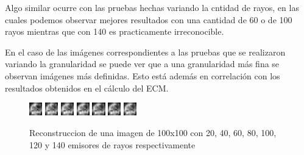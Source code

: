 Algo similar ocurre con las pruebas hechas variando la cntidad de rayos, en las cuales podemos observar mejores resultados con una cantidad de 60 o de 100 rayos mientras que con 140 es practicamente irreconocible.

En el caso de las imágenes correspondientes a las pruebas que se realizaron variando la granularidad se puede ver que a una granularidad más fina se observan imágenes más definidas. Esto está además en correlación con los resultados obtenidos en el cálculo del ECM.



\begin{figure}[H]
    \centering	\includegraphics[width=0.05\textwidth]{img/tomo_emisores_20.png}
\includegraphics[width=0.05\textwidth]{img/tomo_emisores_40.png}
\includegraphics[width=0.05\textwidth]{img/tomo_emisores_60.png}
\includegraphics[width=0.05\textwidth]{img/tomo_emisores_80.png}
\includegraphics[width=0.05\textwidth]{img/tomo_emisores_100.png}
\includegraphics[width=0.05\textwidth]{img/tomo_emisores_120.png}
\includegraphics[width=0.05\textwidth]{img/tomo_emisores_140.png}
	\caption{Reconstruccion de una imagen de 100x100 con 20, 40, 60, 80, 100, 120 y 140 emisores de rayos respectivamente}
	\label{fig:emisores}
\end{figure}


